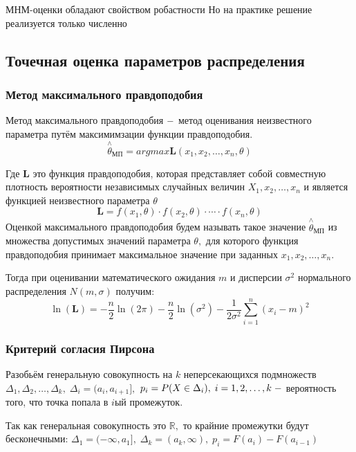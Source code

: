 \documentclass[a4]{article}
\begin{document}
МНМ-оценки обладают свойством робастности
Но на практике решение реализуется только численно

\subsection{Точечная оценка параметров распределения}
\subsubsection{Метод максимального правдоподобия}
Метод максимального правдоподобия $\--$ метод оценивания неизвестного параметра путём максимимзации функции правдоподобия.
\begin{equation}
    \overset{\wedge}{\theta}_{\text{МП}}=argmax \mathbf{L}(x_1,x_2,\ldots,x_n,\theta)
\end{equation}

Где $\mathbf{L}$ это функция правдоподобия, которая представляет собой совместную плотность вероятности независимых случайных величин $X_1,x_2,\ldots,x_n$ и является функцией неизвестного параметра $\theta$
\begin{equation}
    \mathbf{L} = f(x_1,\theta)\cdot f(x_2,\theta)\cdot\cdots\cdot f(x_n,\theta)
\end{equation}
Оценкой максимального правдоподобия будем называть такое значение $\overset{\wedge}{\theta}_{\text{МП}}$ из множества допустимых значений параметра $\theta,$ для которого функция правдоподобия принимает максимальное значение при заданных $x_1,x_2,\ldots,x_n.$

Тогда при оценивании математического ожидания $m$ и дисперсии $\sigma^2$ нормального распределения $N(m,\sigma)$ получим:
\begin{equation}
    \ln(\mathbf{L})=-\frac{n}{2}\ln(2\pi)-\frac{n}{2}\ln\left(\sigma^2\right)-\frac{1}{2\sigma^2}\sum\limits_{i=1}^n(x_i-m)^2
\end{equation}

\subsubsection{Критерий согласия Пирсона}
Разобьём генеральную совокупность на $k$ неперсекающихся подмножеств $\Delta_1, \Delta_2,\ldots, \Delta_k,\;\Delta_i = (a_i,a_{i+1}],$ $p_i = P(X\in\Delta_i),\;i=1,2,\ldots,k\; \--$ вероятность того, что точка попала в $i$ый промежуток.

Так как генеральная совокупность это $\mathbb{R},$ то крайние промежутки будут бесконечными: $\Delta_1=(-\infty,a_1],\;\Delta_k=(a_k,\infty),\;p_i = F(a_i)-F(a_{i-1})$
\end{document}
